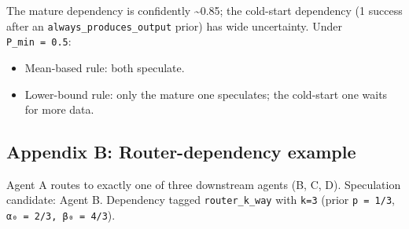 \documentclass[
  11pt,
]{article}
\providecommand{\tightlist}{%
  \setlength{\itemsep}{0pt}\setlength{\parskip}{0pt}}
\begin{document}
The mature dependency is confidently \textasciitilde0.85; the cold-start
dependency (1 success after an \texttt{always\_produces\_output} prior)
has wide uncertainty. Under \texttt{P\_min\ =\ 0.5}:

\begin{itemize}
\tightlist
\item
  Mean-based rule: both speculate.
\item
  Lower-bound rule: only the mature one speculates; the cold-start one
  waits for more data.
\end{itemize}

\subsection{Appendix B: Router-dependency
example}\label{appendix-b-router-dependency-example}

Agent A routes to exactly one of three downstream agents (B, C, D).
Speculation candidate: Agent B. Dependency tagged
\texttt{router\_k\_way} with \texttt{k=3} (prior \texttt{p\ =\ 1/3},
\texttt{α₀\ =\ 2/3,\ β₀\ =\ 4/3}).
\end{document}
